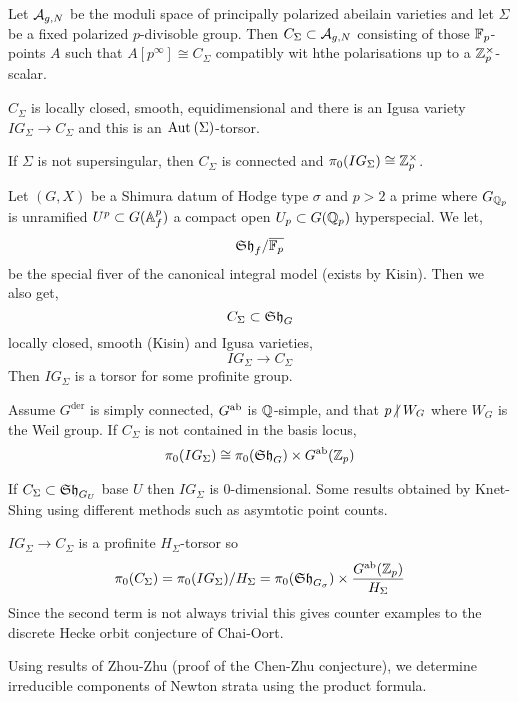 \documentclass[12pt]{article}
\begin{document}
Let $\mathcal{A}_{g,N}$ be the moduli space of principally polarized abeilain varieties and let $\Sigma$ be a fixed polarized $p$-divisoble group. Then $C_\Sigma \subset \mathcal{A}_{g,N}$ consisting of those $\mathbb{F}_p$-points $A$ such that $A[p^\infty] \cong C_\Sigma$ compatibly wit hthe polarisations up to a $\mathbb{Z}_p^\times$-scalar.

\begin{thm}[Oort]
$C_\Sigma$ is locally closed, smooth, equidimensional and there is an Igusa variety $IG_\Sigma \to C_\Sigma$ and this is an $\mathrm{Aut}_{} \left( \Sigma \right)$-torsor.
\end{thm}

\begin{thm}
If $\Sigma$ is not supersingular, then $C_\Sigma$ is connected and $\pi_0(IG_\Sigma) \cong \mathbb{Z}_p^\times$.
\end{thm}

Let $(G, X)$ be a Shimura datum of Hodge type $\sigma$ and $p > 2$ a prime where $G_{\mathbb{Q}_p}$ is unramified $U^p \subset G(\mathbb{A}^p_f)$ a compact open $U_p \subset G(\mathbb{Q}_p)$ hyperspecial. We let,
\[ \mathfrak{Sh}_f / \overline{\mathbb{F}_p} \]
be the special fiver of the canonical integral model (exists by Kisin). Then we also get,
\[ C_\Sigma \subset \mathfrak{Sh}_G \]
locally closed, smooth (Kisin) and Igusa varieties,
\[ IG_\Sigma \to C_\Sigma \]
Then $IG_\Sigma$ is a torsor for some profinite group.

\newcommand{\der}{\mathrm{der}}

\begin{theorem}
Assume $G^\der$ is simply connected, $G^{\mathrm{ab}}$ is $\mathbb{Q}$-simple, and that $p \ndivides W_G$ where $W_G$ is the Weil group. If $C_\Sigma$ is not contained in the basis locus,
\[ \pi_0(IG_\Sigma) \cong \pi_0(\mathfrak{Sh}_G) \times G^{\mathrm{ab}}(\mathbb{Z}_p) \]
\end{theorem}

\begin{rmk}
If $C_\Sigma \subset \mathfrak{Sh}_{G_U}$ base $U$ then $IG_{\Sigma}$ is 0-dimensional. Some results obtained by Knet-Shing using different methods such as asymtotic point counts.
\end{rmk}

\begin{rmk}
$IG_{\Sigma} \to C_\Sigma$ is a profinite $H_\Sigma$-torsor so 
\[ \pi_0(C_\Sigma) = \pi_0(IG_\Sigma)/H_\Sigma = \pi_0(\mathfrak{Sh}_{G_\sigma}) \times \frac{G^{\mathrm{ab}}(\mathbb{Z}_p)}{H_\Sigma} \]
Since the second term is not always trivial this gives counter examples to the discrete Hecke orbit conjecture of Chai-Oort.
\end{rmk}

\begin{rmk}
Using results of Zhou-Zhu (proof of the Chen-Zhu conjecture), we determine irreducible components of Newton strata using the product formula.
\end{rmk}
\end{document}
